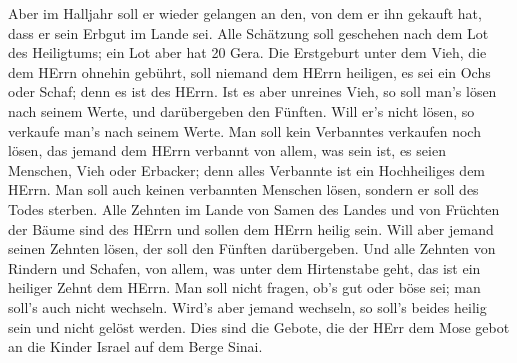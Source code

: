  Aber im Halljahr soll er wieder gelangen an den, von dem
er ihn gekauft hat, dass er sein Erbgut im Lande sei.  Alle
Schätzung soll geschehen nach dem Lot des Heiligtums; ein Lot aber hat
20 Gera.  Die Erstgeburt unter dem Vieh, die dem HErrn
ohnehin gebührt, soll niemand dem HErrn heiligen, es sei ein Ochs oder
Schaf; denn es ist des HErrn.  Ist es aber unreines Vieh,
so soll man's lösen nach seinem Werte, und darübergeben den Fünften.
Will er's nicht lösen, so verkaufe man's nach seinem Werte.
 Man soll kein Verbanntes verkaufen noch lösen, das jemand
dem HErrn verbannt von allem, was sein ist, es seien Menschen, Vieh oder
Erbacker; denn alles Verbannte ist ein Hochheiliges dem HErrn.
 Man soll auch keinen verbannten Menschen lösen, sondern er
soll des Todes sterben.  Alle Zehnten im Lande von Samen
des Landes und von Früchten der Bäume sind des HErrn und sollen dem
HErrn heilig sein.  Will aber jemand seinen Zehnten lösen,
der soll den Fünften darübergeben.  Und alle Zehnten von
Rindern und Schafen, von allem, was unter dem Hirtenstabe geht, das ist
ein heiliger Zehnt dem HErrn.  Man soll nicht fragen, ob's
gut oder böse sei; man soll's auch nicht wechseln. Wird's aber jemand
wechseln, so soll's beides heilig sein und nicht gelöst werden.
 Dies sind die Gebote, die der HErr dem Mose gebot an die
Kinder Israel auf dem Berge Sinai.

